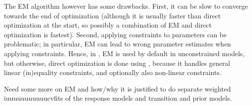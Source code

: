 \documentclass[article]{jss}
\newcommand{\mat}{\mathbf}
\begin{document}



The EM algorithm however has some drawbacks.  First, it can be slow to
converge towards the end of optimization (although it is usually
faster than direct optimization at the start, so possibly a
combination of EM and direct optimization is fastest).  Second,
applying constraints to parameters can be problematic; in particular,
EM can lead to wrong parameter estimates when applying constraints.
Hence, in , EM is used by default in unconstrained
models, but otherwise, direct optimization is done using 
\cite{Tamura2007,Spellucci2002}, because it handles general linear
(in)equality constraints, and optionally also non-linear constraints.

Need some more on EM and how/why it is justified to do separate weighted
iuuuuuuuuuuucvfits of the response models and transition and prior models. 
\end{document}
